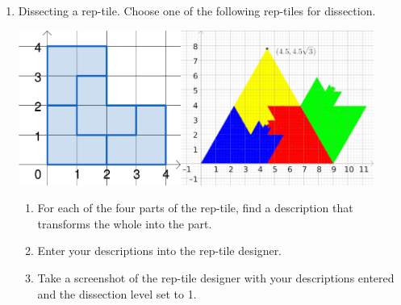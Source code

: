 \begin{enumerate}
\begin{enumerate}
\begin{enumerate}
\end{enumerate}

\item Dissecting a rep-tile. Choose one of the following rep-tiles for dissection.
\begin{center}
    \includegraphics[height=2in]{images/rep-tiles-25}\hspace{.5in}\includegraphics[height=2in]{images/rep-tiles-30}
\end{center}
\begin{enumerate}
\item For each of the four parts of the rep-tile, find a description that transforms the whole into the part.
\item Enter your descriptions into the rep-tile designer.
\item Take a screenshot of the rep-tile designer with your descriptions entered and the dissection level set to 1.
\end{enumerate}
\end{enumerate}
\end{enumerate}